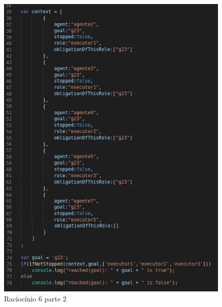 \begin{figure}[H]
  \centering
  \includegraphics[width=0.8\linewidth]{figure/algjs2} 
  \caption{Raciocínio 6 parte 2}
  \label{atividiagram2}
\end{figure}
